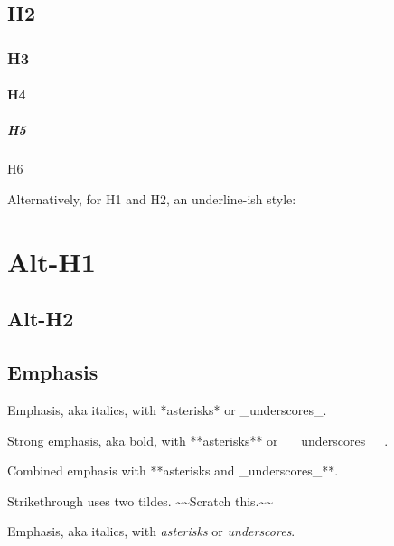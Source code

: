 \documentclass[
]{tufte-pandoc}
\newenvironment{Shaded}{}{}
\newcommand{\NormalTok}[1]{#1}
\begin{document}
\hypertarget{h2}{%
\subsection{H2}\label{h2}}

\hypertarget{h3}{%
\subsubsection{H3}\label{h3}}

\hypertarget{h4}{%
\paragraph{H4}\label{h4}}

\hypertarget{h5}{%
\subparagraph{H5}\label{h5}}

H6

Alternatively, for H1 and H2, an underline-ish style:

\hypertarget{alt-h1}{%
\section{Alt-H1}\label{alt-h1}}

\hypertarget{alt-h2}{%
\subsection{Alt-H2}\label{alt-h2}}

\hypertarget{emphasis}{%
\subsection{Emphasis}\label{emphasis}}

\begin{Shaded}
\begin{Highlighting}[]
\NormalTok{Emphasis, aka italics, with *asterisks* or \_underscores\_.}

\NormalTok{Strong emphasis, aka bold, with **asterisks** or \_\_underscores\_\_.}

\NormalTok{Combined emphasis with **asterisks and \_underscores\_**.}

\NormalTok{Strikethrough uses two tildes. \textasciitilde{}\textasciitilde{}Scratch this.\textasciitilde{}\textasciitilde{}}
\end{Highlighting}
\end{Shaded}

Emphasis, aka italics, with \emph{asterisks} or \emph{underscores}.
\end{document}
